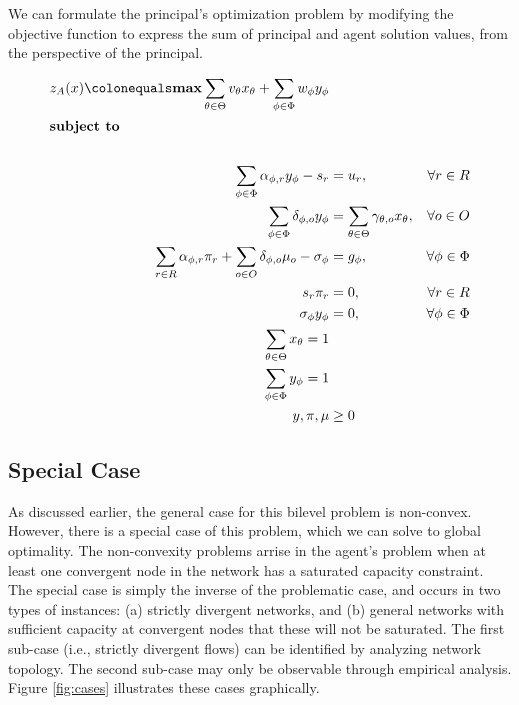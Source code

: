 We can formulate the principal's optimization problem by modifying the objective function to express the sum of principal and agent solution values, from the perspective of the principal.

\begin{align} 
    z_A(x) \colonequals \boldsymbol{\max}  \sum_{\theta \in \Theta} v_{\theta} x_{\theta} + \sum_{\phi \in \Phi} w_{\phi} y_{\phi} \\
    \shortintertext{\textbf{subject to} \nonumber} \\
    \sum_{\phi \in \Phi} \alpha_{\phi,r} y_{\phi}  - s_r  & = u_r, & \forall r \in R \\
    \sum_{\phi \in \Phi} \delta_{\phi,o} y_{\phi} & = \sum_{\theta \in \Theta} \gamma_{\theta,o} x_{\theta} , & \forall o \in O \\
    \sum_{r \in R} \alpha_{\phi,r} \pi_r + \sum_{o \in O} \delta_{\phi,o} \mu_o - \sigma_\phi  & = g_{\phi} , & \forall \phi \in \Phi \\
     s_r \pi_r & = 0 , & \forall r \in R \\
    \sigma_{\phi} y_{\phi} & = 0 , & \forall \phi \in \Phi \\
    \sum_{\theta \in \Theta} x_\theta = 1 \\
    \sum_{\phi \in \Phi} y_\phi = 1 \\
    y, \pi, \mu & \geq 0 
\end{align}

\subsection{Special Case}

As discussed earlier, the general case for this bilevel problem is non-convex. 
However, there is a special case of this problem, which we can solve to global optimality. 
The non-convexity problems arrise in the agent's problem when at least one convergent node in the network has a saturated capacity constraint. 
The special case is simply the inverse of the problematic case, and occurs in two types of instances: (a) strictly divergent networks, and (b) general networks with sufficient capacity at convergent nodes that these will not be saturated. 
The first sub-case (i.e., strictly divergent flows) can be identified by analyzing network topology. 
The second sub-case may only be observable through empirical analysis. 
Figure \ref{fig:cases} illustrates these cases graphically. 

